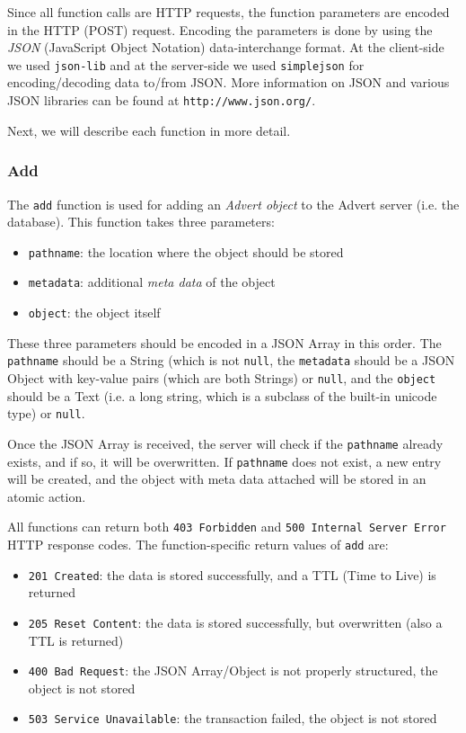 Since all function calls are HTTP requests, the function parameters are encoded
in the HTTP (POST) request. Encoding the parameters is done by using the
\emph{JSON} (JavaScript Object Notation) data-interchange format. At the
client-side we used \texttt{json-lib} and at the server-side we used
\texttt{simplejson} for encoding/decoding data to/from JSON. More information
on JSON and various JSON libraries can be found at \texttt{http://www.json.org/}.

Next, we will describe each function in more detail.

\subsubsection{Add}
\label{add}
The \texttt{add} function is used for adding an \emph{Advert object} to the
Advert server (i.e. the database). This function takes three parameters:

\begin{itemize}
  \item \texttt{pathname}: the location where the object should be stored
  \item \texttt{metadata}: additional \emph{meta data} of the object
  \item \texttt{object}: the object itself
\end{itemize}

These three parameters should be encoded in a JSON Array in this order. The
\texttt{pathname} should be a String (which is not \texttt{null}, the
\texttt{metadata} should be a JSON Object with key-value pairs (which are both
Strings) or \texttt{null}, and the \texttt{object} should be a Text (i.e. a long
string, which is a subclass of the built-in unicode type) or \texttt{null}.

Once the JSON Array is received, the server will check if the \texttt{pathname}
already exists, and if so, it will be overwritten. If \texttt{pathname} does
not exist, a new entry will be created, and the object with meta data attached
will be stored in an atomic action.

All functions can return both \texttt{403 Forbidden} and \texttt{500 Internal
Server Error} HTTP response codes. The function-specific return values of
\texttt{add} are:

\begin{itemize}
  \item \texttt{201 Created}: the data is stored successfully, and a TTL (Time
  to
  Live) is returned
  \item \texttt{205 Reset Content}: the data is stored successfully, but
  overwritten (also a TTL is returned)
  \item \texttt{400 Bad Request}: the JSON Array/Object is not properly
  structured, the object is not stored
  \item \texttt{503 Service Unavailable}: the transaction failed, the object is
  not stored
\end{itemize}

